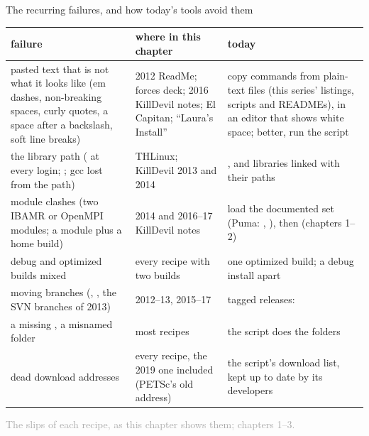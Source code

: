 \documentclass[aspectratio=169,11pt]{beamer}
\newcommand{\sourcecredit}[1]{\vfill\begin{flushright}\tiny\textcolor{DarkGray}{#1}\end{flushright}}
\begin{document}
\begin{frame}{The recurring failures, and how today's tools avoid them}
\label{fr:failures}
\scriptsize
\renewcommand{\arraystretch}{1.07}
\setlength{\tabcolsep}{4pt}
\begin{tabular}{@{}L{0.27\textwidth}L{0.32\textwidth}L{0.36\textwidth}@{}}
\toprule
failure & where in this chapter & today \\
\midrule
pasted text that is not what it looks like (em dashes, non-breaking spaces, curly quotes, a space after a backslash, soft line breaks) & 2012 ReadMe; forces deck; 2016 KillDevil notes; El Capitan; ``Laura's Install'' & copy commands from plain-text files (this series' listings, scripts and READMEs), in an editor that shows white space; better, run the script \\
the library path ( at every login; ; gcc lost from the path) & THLinux; KillDevil 2013 and 2014 & , and libraries linked with their paths \\
module clashes (two IBAMR or OpenMPI modules; a module plus a home build) & 2014 and 2016--17 KillDevil notes & load the documented set (Puma: , ), then  (chapters 1--2) \\
debug and optimized builds mixed & every recipe with two builds & one optimized build; a debug install apart \\
moving branches (, , the SVN branches of 2013) & 2012--13, 2015--17 & tagged releases:  \\
a missing , a misnamed folder & most recipes & the script does the folders \\
dead download addresses & every recipe, the 2019 one included (PETSc's old  address) & the script's download list, kept up to date by its developers \\
\bottomrule
\end{tabular}
\sourcecredit{The slips of each recipe, as this chapter shows them; chapters 1--3.}
\end{frame}
\end{document}
